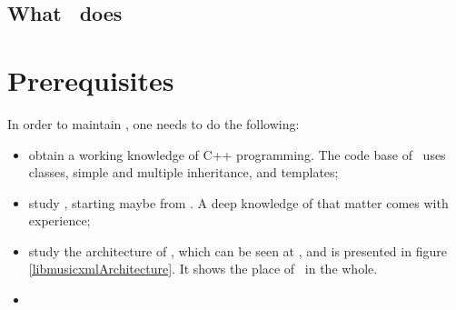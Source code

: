 \documentclass[12pt,a4paper]{article}
\begin{document}
\subsection{What \xmlToLy\ does}


\section{Prerequisites}

In order to maintain \xmlToLy, one needs to do the following:
\begin{itemize}
\item obtain a working knowledge of C++ programming. The code base of \xmlToLy\ uses classes, simple and multiple inheritance, and templates;

\item study \mxml, starting maybe from . A deep knowledge of that matter comes with experience;

\item study the architecture of \lib, which can be seen at , and is presented in figure \ref{libmusicxmlArchitecture}.
It shows the place of \xmlToLy\ in the whole.

\item
\end{itemize}
\end{document}
